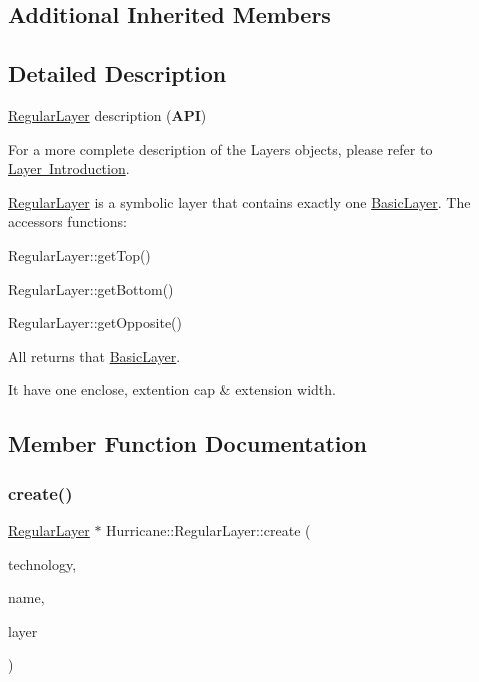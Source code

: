 \subsection*{Additional Inherited Members}


\subsection{Detailed Description}
\mbox{\hyperlink{classHurricane_1_1RegularLayer}{Regular\+Layer}} description ({\bfseries A\+PI}) 

For a more complete description of the Layers objects, please refer to \mbox{\hyperlink{classHurricane_1_1Layer_secLayerIntro}{Layer Introduction}}.

\mbox{\hyperlink{classHurricane_1_1RegularLayer}{Regular\+Layer}} is a symbolic layer that contains exactly one \mbox{\hyperlink{classHurricane_1_1BasicLayer}{Basic\+Layer}}. The accessors functions\+: 
\begin{DoxyItemize}
\item Regular\+Layer\+::get\+Top() 
\item Regular\+Layer\+::get\+Bottom() 
\item Regular\+Layer\+::get\+Opposite() 
\end{DoxyItemize}All returns that \mbox{\hyperlink{classHurricane_1_1BasicLayer}{Basic\+Layer}}.

It have one enclose, extention cap \& extension width. 

\subsection{Member Function Documentation}
\mbox{\label{classHurricane_1_1RegularLayer_a6b40a35fec1c4fc168d608b8b96c8477}} 
\subsubsection{\texorpdfstring{create()}{create()}}
{\footnotesize\ttfamily \mbox{\hyperlink{classHurricane_1_1RegularLayer}{Regular\+Layer}} $\ast$ Hurricane\+::\+Regular\+Layer\+::create (\begin{DoxyParamCaption}\item[{\mbox{\hyperlink{classHurricane_1_1Technology}{Technology}} $\ast$}]{technology,  }\item[{const \mbox{\hyperlink{classHurricane_1_1Name}{Name}} \&}]{name,  }\item[{\mbox{\hyperlink{classHurricane_1_1BasicLayer}{Basic\+Layer}} $\ast$}]{layer }\end{DoxyParamCaption})\hspace{0.3cm}{\ttfamily [static]}}

